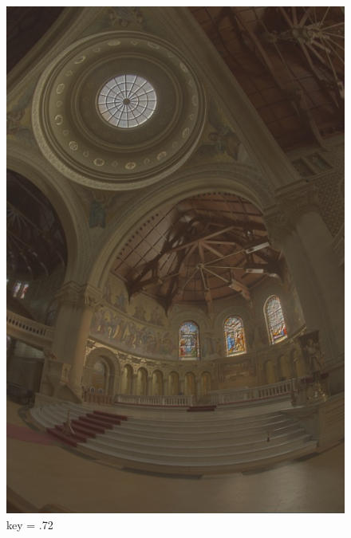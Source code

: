 \documentclass{article}
\begin{document}
\begin{figure}[!htb]
      \includegraphics[scale=.27]{./data/3/avar/7_2.jpg}
      \caption{key = .72}
    \endminipage
    \end{figure}
    
\end{document}

